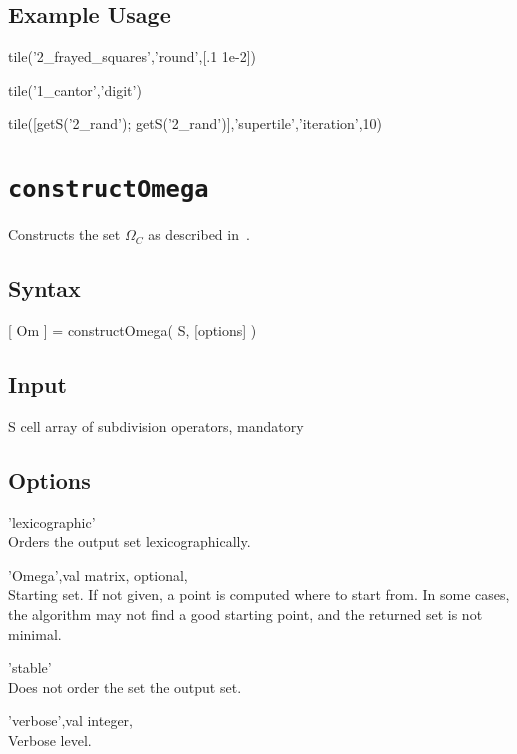 \subsection*{Example Usage}
\begin{param}
\item[{tile('2\_frayed\_squares','round',[.1 1e-2])}]
\item[{tile('1\_cantor','digit')}]
\item[{tile([getS('2\_rand'); getS('2\_rand')],'supertile','iteration',10)}]   
\end{param} 

\section{\texttt{constructOmega}}
Constructs the set $\Omega_C$ as described in~\cite{CM18}.

\subsection*{Syntax}
\begin{param}
    \item[{[ Om ] = constructOmega( S, [options] )}]
\end{param}

\subsection*{Input}
\begin{param}
    \item[S] cell array of subdivision operators, mandatory
\end{param}

\subsection*{Options}
\begin{param}
    \item['lexicographic']      \\Orders the output set lexicographically.
    \item['Omega',val] matrix, optional, \\
        Starting set. If not given, a point is computed where to start from.
        In some cases, the algorithm may not find a good starting point, and the returned set is not minimal.
    \item['stable'] \\Does not order the set the output set.        
    \item['verbose',val] integer, \\Verbose level.
\end{param}    

